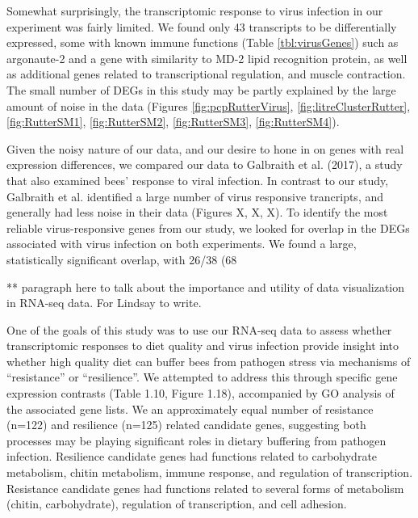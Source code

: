 \documentclass[11pt,a4paper,oldfontcommands,openany]{memoir}
\numberwithin{equation}{section} %
\begin{document}
Somewhat surprisingly, the transcriptomic response to virus infection in our experiment was fairly limited. We found only 43 transcripts to be differentially expressed, some with known immune functions (Table \ref{tbl:virusGenes}) such as argonaute-2 and a gene with similarity to MD-2 lipid recognition protein, as well as additional genes related to transcriptional regulation, and muscle contraction.  The small number of DEGs in this study may be partly explained by the large amount of noise in the data (Figures \ref{fig:pcpRutterVirus}, \ref{fig:litreClusterRutter}, \ref{fig:RutterSM1}, \ref{fig:RutterSM2}, \ref{fig:RutterSM3}, \ref{fig:RutterSM4}).

Given the noisy nature of our data, and our desire to hone in on genes with real expression differences, we compared our data to Galbraith et al. (2017), a study that also examined bees’ response to viral infection.  In contrast to our study, Galbraith et al. identified a large number of virus responsive trancripts, and generally had less noise in their data (Figures X, X, X).  To identify the most reliable virus-responsive genes from our study, we looked for overlap in the DEGs associated with virus infection on both experiments.  We found a large, statistically significant overlap, with 26/38 (68%

** paragraph here to talk about the importance and utility of data visualization in RNA-seq data.  For Lindsay to write.

One of the goals of this study was to use our RNA-seq data to assess whether transcriptomic responses to diet quality and virus infection provide insight into whether high quality diet can buffer bees from pathogen stress via mechanisms of “resistance” or “resilience”.  We attempted to address this through specific gene expression contrasts (Table 1.10, Figure 1.18), accompanied by GO analysis of the associated gene lists.  We an approximately equal number of resistance (n=122) and resilience (n=125) related candidate genes, suggesting both processes may be playing significant roles in dietary buffering from pathogen infection.  Resilience candidate genes had functions related to carbohydrate metabolism, chitin metabolism, immune response, and regulation of transcription.  Resistance candidate genes had functions related to several forms of metabolism (chitin, carbohydrate), regulation of transcription, and cell adhesion.  
\end{document}
